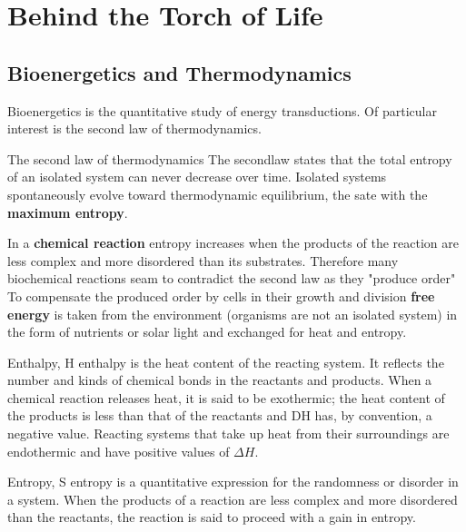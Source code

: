 \documentclass[../main.tex]{subfiles}
\begin{document}
\section{Behind the Torch of Life}
\subsection{Bioenergetics and Thermodynamics}
Bioenergetics is the quantitative study of energy 
transductions. Of particular interest is the second law of thermodynamics.
\begin{DefWithTitle}{The second law of thermodynamics}
	The \gls{secondlaw} states that the total entropy of an isolated system can never decrease over time. Isolated systems spontaneously evolve toward thermodynamic equilibrium, the sate with the \textbf{maximum entropy}.
\end{DefWithTitle}
In a \textbf{chemical reaction} entropy increases when the products of the reaction are less complex and more disordered than its substrates. Therefore many biochemical reactions seam to contradict the second law as they "produce order"\\
To compensate the produced order by cells in their growth and division \textbf{free energy} is taken from the environment (organisms are not an isolated system) in the form of nutrients or solar light and exchanged for heat and entropy.

\begin{DefWithTitle}{Enthalpy, H}
	\gls{enthalpy} is the heat content of the reacting 
	system. It reflects the number and kinds of chemical bonds in the reactants and products. When a chemical reaction releases heat, it is said to be exothermic; the heat content of the products is less than that of the reactants and DH has, by convention, a negative value. Reacting systems that take up heat from their surroundings are endothermic and have positive values of $\Delta H$.
\end{DefWithTitle}

\begin{DefWithTitle}{Entropy, S}
	\gls{entropy} is a quantitative expression for the randomness or disorder in a system. When the products of a reaction are less complex and more disordered than the reactants, the reaction is said to proceed with a gain in entropy.
\end{DefWithTitle}
\end{document}
